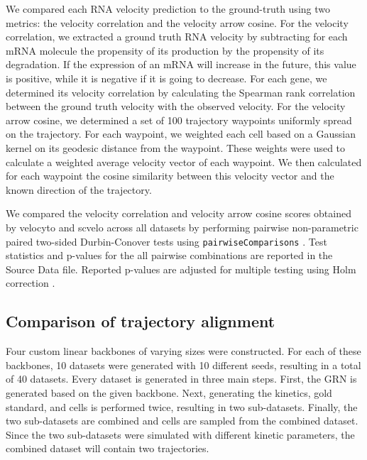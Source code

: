 \documentclass[10pt, a4paper]{article}
\begin{document}
We compared each RNA velocity prediction to the ground-truth using two
metrics: the velocity correlation and the velocity arrow cosine. For the
velocity correlation, we extracted a ground truth RNA velocity by
subtracting for each mRNA molecule the propensity of its production by
the propensity of its degradation. If the expression of an mRNA will
increase in the future, this value is positive, while it is negative if
it is going to decrease. For each gene, we determined its velocity
correlation by calculating the Spearman rank correlation between the
ground truth velocity with the observed velocity. For the velocity arrow
cosine, we determined a set of 100 trajectory waypoints uniformly spread
on the trajectory. For each waypoint, we weighted each cell based on a
Gaussian kernel on its geodesic distance from the waypoint. These
weights were used to calculate a weighted average velocity vector of
each waypoint. We then calculated for each waypoint the cosine
similarity between this velocity vector and the known direction of the
trajectory.

We compared the velocity correlation and velocity arrow cosine scores
obtained by velocyto and scvelo across all datasets by performing
pairwise non-parametric paired two-sided Durbin-Conover tests
\cite{conover_multiplecomparisonsprocedures_1979} using
\texttt{pairwiseComparisons}
\cite{patil_pairwisecomparisonsmultiplepairwise_2019}. Test
statistics and p-values for the all pairwise combinations are reported
in the Source Data file. Reported p-values are adjusted for multiple
testing using Holm correction
\cite{holm_simplesequentiallyrejective_1979}.

 \subsection{Comparison of trajectory alignment}\label{sec:dyngen-tacompare}

Four custom linear backbones of varying sizes were constructed. For each
of these backbones, 10 datasets were generated with 10 different seeds,
resulting in a total of 40 datasets. Every dataset is generated in three
main steps. First, the GRN is generated based on the given backbone.
Next, generating the kinetics, gold standard, and cells is performed
twice, resulting in two sub-datasets. Finally, the two sub-datasets are
combined and cells are sampled from the combined dataset. Since the two
sub-datasets were simulated with different kinetic parameters, the
combined dataset will contain two trajectories.
\end{document}
